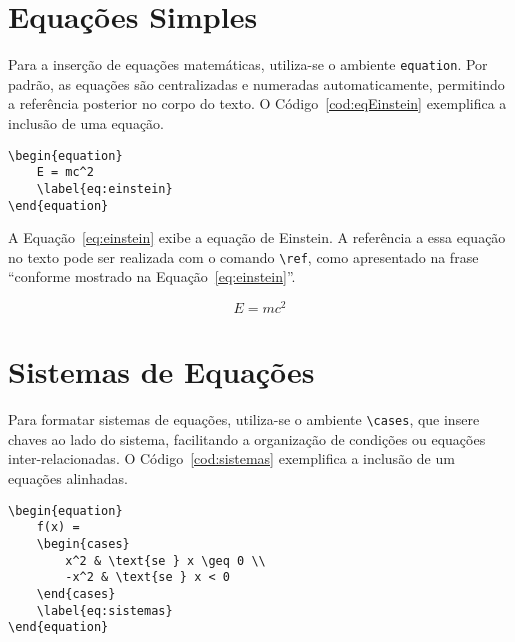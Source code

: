 \documentclass[
    12pt
    ,oneside
    ,a4paper
    ,chapter=TITLE
    ,section=TITLE
    ,sumario=abnt-6027-2012]{abntex2}
\begin{document}
\section{Equações Simples}

Para a inserção de equações matemáticas, utiliza-se o ambiente \texttt{equation}. Por padrão, as equações são centralizadas e numeradas automaticamente, permitindo a referência posterior no corpo do texto. O Código~\ref{cod:eqEinstein} exemplifica a inclusão de uma equação.

\begin{codigo}[htb]
\begin{lstlisting}
\begin{equation}
    E = mc^2
    \label{eq:einstein}
\end{equation}
\end{lstlisting}
\fonteautor
\end{codigo}

A Equação~\eqref{eq:einstein} exibe a equação de Einstein. A referência a essa equação no texto pode ser realizada com o comando \texttt{\textbackslash ref}, como apresentado na frase ``conforme mostrado na Equação~\ref{eq:einstein}''.

\begin{equation}
    E = mc^2
    \label{eq:einstein}
\end{equation}

\section{Sistemas de Equações}

Para formatar sistemas de equações, utiliza-se o ambiente \texttt{\textbackslash cases}, que insere chaves ao lado do sistema, facilitando a organização de condições ou equações inter-relacionadas. O Código~\ref{cod:sistemas} exemplifica a inclusão de um equações alinhadas.

\begin{codigo}[htb]
\begin{lstlisting}
\begin{equation}
    f(x) =
    \begin{cases}
        x^2 & \text{se } x \geq 0 \\
        -x^2 & \text{se } x < 0
    \end{cases}
    \label{eq:sistemas}
\end{equation}
\end{lstlisting}
\fonteautor
\end{codigo}
\end{document}
